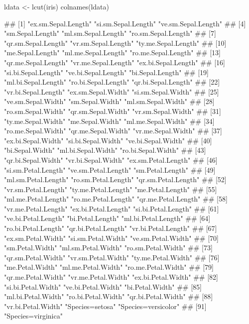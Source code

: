 \begin{Schunk}
% --begin: "casestudy-assoc-lcut"
\begin{Sinput}
ldata <- lcut(iris)
colnames(ldata)
\end{Sinput}
\begin{Soutput}
##  [1] "ex.sm.Sepal.Length" "si.sm.Sepal.Length" "ve.sm.Sepal.Length"
##  [4] "sm.Sepal.Length"    "ml.sm.Sepal.Length" "ro.sm.Sepal.Length"
##  [7] "qr.sm.Sepal.Length" "vr.sm.Sepal.Length" "ty.me.Sepal.Length"
## [10] "me.Sepal.Length"    "ml.me.Sepal.Length" "ro.me.Sepal.Length"
## [13] "qr.me.Sepal.Length" "vr.me.Sepal.Length" "ex.bi.Sepal.Length"
## [16] "si.bi.Sepal.Length" "ve.bi.Sepal.Length" "bi.Sepal.Length"   
## [19] "ml.bi.Sepal.Length" "ro.bi.Sepal.Length" "qr.bi.Sepal.Length"
## [22] "vr.bi.Sepal.Length" "ex.sm.Sepal.Width"  "si.sm.Sepal.Width" 
## [25] "ve.sm.Sepal.Width"  "sm.Sepal.Width"     "ml.sm.Sepal.Width" 
## [28] "ro.sm.Sepal.Width"  "qr.sm.Sepal.Width"  "vr.sm.Sepal.Width" 
## [31] "ty.me.Sepal.Width"  "me.Sepal.Width"     "ml.me.Sepal.Width" 
## [34] "ro.me.Sepal.Width"  "qr.me.Sepal.Width"  "vr.me.Sepal.Width" 
## [37] "ex.bi.Sepal.Width"  "si.bi.Sepal.Width"  "ve.bi.Sepal.Width" 
## [40] "bi.Sepal.Width"     "ml.bi.Sepal.Width"  "ro.bi.Sepal.Width" 
## [43] "qr.bi.Sepal.Width"  "vr.bi.Sepal.Width"  "ex.sm.Petal.Length"
## [46] "si.sm.Petal.Length" "ve.sm.Petal.Length" "sm.Petal.Length"   
## [49] "ml.sm.Petal.Length" "ro.sm.Petal.Length" "qr.sm.Petal.Length"
## [52] "vr.sm.Petal.Length" "ty.me.Petal.Length" "me.Petal.Length"   
## [55] "ml.me.Petal.Length" "ro.me.Petal.Length" "qr.me.Petal.Length"
## [58] "vr.me.Petal.Length" "ex.bi.Petal.Length" "si.bi.Petal.Length"
## [61] "ve.bi.Petal.Length" "bi.Petal.Length"    "ml.bi.Petal.Length"
## [64] "ro.bi.Petal.Length" "qr.bi.Petal.Length" "vr.bi.Petal.Length"
## [67] "ex.sm.Petal.Width"  "si.sm.Petal.Width"  "ve.sm.Petal.Width" 
## [70] "sm.Petal.Width"     "ml.sm.Petal.Width"  "ro.sm.Petal.Width" 
## [73] "qr.sm.Petal.Width"  "vr.sm.Petal.Width"  "ty.me.Petal.Width" 
## [76] "me.Petal.Width"     "ml.me.Petal.Width"  "ro.me.Petal.Width" 
## [79] "qr.me.Petal.Width"  "vr.me.Petal.Width"  "ex.bi.Petal.Width" 
## [82] "si.bi.Petal.Width"  "ve.bi.Petal.Width"  "bi.Petal.Width"    
## [85] "ml.bi.Petal.Width"  "ro.bi.Petal.Width"  "qr.bi.Petal.Width" 
## [88] "vr.bi.Petal.Width"  "Species=setosa"     "Species=versicolor"
## [91] "Species=virginica"
\end{Soutput}
%
% --end: "casestudy-assoc-lcut"
\end{Schunk}
